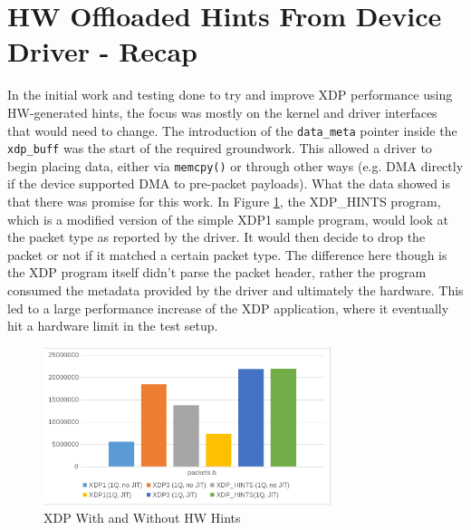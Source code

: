 \documentclass[letterpaper]{article}
\begin{document}
\section{HW Offloaded Hints From Device Driver - Recap} 
In the initial work and testing done to try and improve XDP performance using HW-generated hints, the focus was mostly on the kernel and driver interfaces that would need to change.  The introduction of the {\small \texttt{data\_meta}} pointer inside the {\small \texttt{xdp\_buff}} was the start of the required groundwork.  This allowed a driver to begin placing data, either via {\small \texttt{memcpy()}} or through other ways (e.g. DMA directly if the device supported DMA to pre-packet payloads).
\newline
\newline
What the data showed is that there was promise for this work.  In Figure \ref{xdp-program-performance}, the XDP\_HINTS program, which is a modified version of the simple XDP1 sample program, would look at the packet type as reported by the driver.  It would then decide to drop the packet or not if it matched a certain packet type.  The difference here though is the XDP program itself didn't parse the packet header, rather the program consumed the metadata provided by the driver and ultimately the hardware.  This led to a large performance increase of the XDP application, where it eventually hit a hardware limit in the test setup.

\begin{figure}[h]
\includegraphics[width=3.31in]{xdp-programs-performance.png}
\caption{XDP With and Without HW Hints}
\label{xdp-program-performance}
\end{figure}
\end{document}
